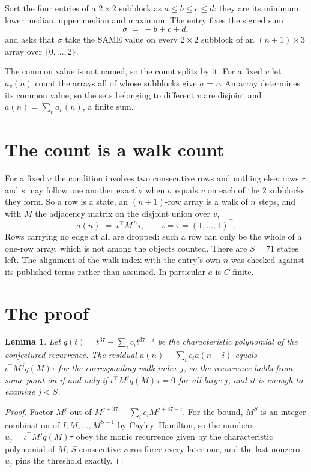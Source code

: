 \documentclass[11pt,a4paper]{article}
\theoremstyle{plain}
\newtheorem{lemma}[theorem]{Lemma}
\theoremstyle{definition}
\begin{document}
Sort the four entries of a $2\times2$ subblock as $a\le b\le c\le d$: they
are its minimum, lower median, upper median and maximum. The entry fixes the signed sum
\[
\sigma\;=\;-b+c+d,
\]
and asks that $\sigma$ take the SAME value on every $2\times2$ subblock of an
$(n+1)\times3$ array over $\{0,\dots,2\}$.

The common value is not named, so the count splits by it. For a fixed $v$ let $a_v(n)$ count
the arrays all of whose subblocks give $\sigma=v$. An array determines its common value, so
the sets belonging to different $v$ are disjoint and $a(n)=\sum_v a_v(n)$, a finite sum.


\section{The count is a walk count}

For a fixed $v$ the condition involves two consecutive rows and nothing
else: rows $r$ and $s$ may follow one another exactly when $\sigma$ equals $v$ on each of the
$2$ subblocks they form. So a row is a state, an $(n+1)$-row array is a walk of $n$
steps, and with $M$ the adjacency matrix on the disjoint union over $v$,
\[
a(n)\;=\;\iota^{\!\top}M^{\,n}\tau,\qquad\iota=\tau=(1,\dots,1)^{\!\top} .
\]
Rows carrying no edge at all are dropped: such a row can only be the whole of a one-row
array, which is not among the objects counted. There are $S=71$ states left.
The alignment of the walk index with the entry's own $n$ was checked against its published
terms rather than assumed. In particular $a$ is $C$-finite.

\section{The proof}

\begin{lemma}\label{lem:crit}
Let $q(t)=t^{37}-\sum_i c_it^{37-i}$ be the characteristic polynomial of the
conjectured recurrence. The residual $a(n)-\sum_ic_ia(n-i)$ equals
$\iota^{\!\top}M^{\,j}q(M)\tau$ for the corresponding walk index $j$, so the recurrence
holds from some point on if and only if $\iota^{\!\top}M^{j}q(M)\tau=0$ for all large $j$,
and it is enough to examine $j<S$.
\end{lemma}

\begin{proof}
Factor $M^{j}$ out of $M^{j+37}-\sum_ic_iM^{j+37-i}$. For the bound, $M^{S}$
is an integer combination of $I,M,\dots,M^{S-1}$ by Cayley--Hamilton, so the numbers
$u_j=\iota^{\!\top}M^{j}q(M)\tau$ obey the monic recurrence given by the characteristic
polynomial of $M$; $S$ consecutive zeros force every later one, and the last nonzero $u_j$
pins the threshold exactly.
\end{proof}
\end{document}
